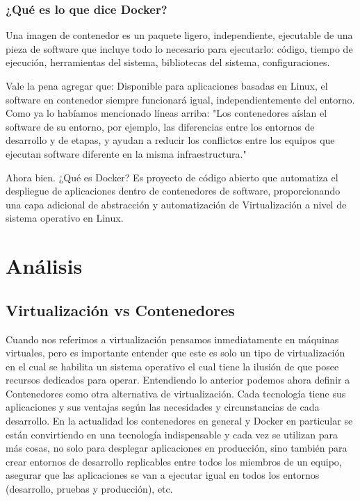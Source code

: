 \documentclass[preprint,12pt]{elsarticle}
\begin{document}
\subsubsection{\textbf{¿Qué es lo que dice Docker?}}
Una imagen de contenedor es un paquete ligero, independiente, ejecutable de una pieza de software que incluye todo lo necesario para ejecutarlo: código, tiempo de ejecución, herramientas del sistema, bibliotecas del sistema, configuraciones.

Vale la pena agregar que: Disponible para aplicaciones basadas en Linux, el software en contenedor siempre funcionará igual, independientemente del entorno. Como ya lo habíamos mencionado líneas arriba: "Los contenedores aíslan el software de su entorno, por ejemplo, las diferencias entre los entornos de desarrollo y de etapas, y ayudan a reducir los conflictos entre los equipos que ejecutan software diferente en la misma infraestructura."

Ahora bien. ¿Qué es Docker? Es proyecto de código abierto que automatiza el despliegue de aplicaciones dentro de contenedores de software, proporcionando una capa adicional de abstracción y automatización de Virtualización a nivel de sistema operativo en Linux.


 



\section{Análisis}
\subsection{\textbf{Virtualización vs Contenedores}}
Cuando nos referimos a virtualización pensamos inmediatamente en máquinas virtuales, pero es importante entender que este es solo un tipo de virtualización en el cual se habilita un sistema operativo el cual tiene la ilusión de que posee recursos dedicados para operar. Entendiendo lo anterior podemos ahora definir a Contenedores como otra alternativa de virtualización.
Cada tecnología tiene sus aplicaciones y sus ventajas según las necesidades y circunstancias de cada desarrollo. En la actualidad los contenedores en general y Docker en particular se están convirtiendo en una tecnología indispensable y cada vez se utilizan para más cosas, no solo para desplegar aplicaciones en producción, sino también para crear entornos de desarrollo replicables entre todos los miembros de un equipo, asegurar que las aplicaciones se van a ejecutar igual en todos los entornos (desarrollo, pruebas y producción), etc. 
\end{document}

